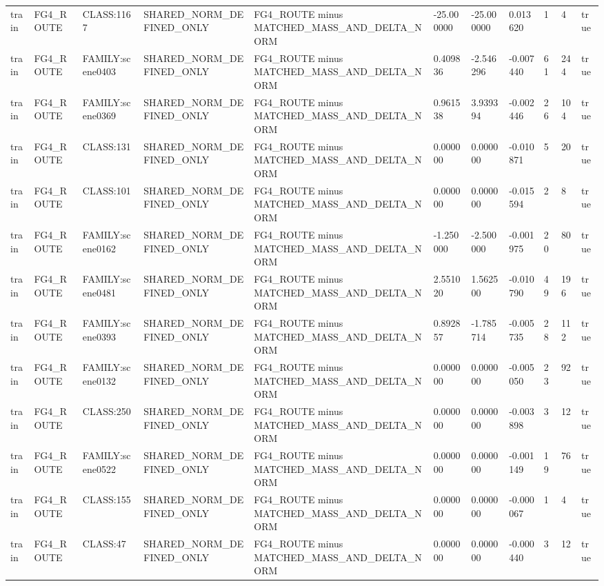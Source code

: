 \begin{tabular}{lllllllllll}
train & FG4\_ROUTE & CLASS:1167 & SHARED\_NORM\_DEFINED\_ONLY & FG4\_ROUTE minus MATCHED\_MASS\_AND\_DELTA\_NORM & -25.000000 & -25.000000 & 0.013620 & 1 & 4 & true \\
train & FG4\_ROUTE & FAMILY:scene0403 & SHARED\_NORM\_DEFINED\_ONLY & FG4\_ROUTE minus MATCHED\_MASS\_AND\_DELTA\_NORM & 0.409836 & -2.546296 & -0.007440 & 61 & 244 & true \\
train & FG4\_ROUTE & FAMILY:scene0369 & SHARED\_NORM\_DEFINED\_ONLY & FG4\_ROUTE minus MATCHED\_MASS\_AND\_DELTA\_NORM & 0.961538 & 3.939394 & -0.002446 & 26 & 104 & true \\
train & FG4\_ROUTE & CLASS:131 & SHARED\_NORM\_DEFINED\_ONLY & FG4\_ROUTE minus MATCHED\_MASS\_AND\_DELTA\_NORM & 0.000000 & 0.000000 & -0.010871 & 5 & 20 & true \\
train & FG4\_ROUTE & CLASS:101 & SHARED\_NORM\_DEFINED\_ONLY & FG4\_ROUTE minus MATCHED\_MASS\_AND\_DELTA\_NORM & 0.000000 & 0.000000 & -0.015594 & 2 & 8 & true \\
train & FG4\_ROUTE & FAMILY:scene0162 & SHARED\_NORM\_DEFINED\_ONLY & FG4\_ROUTE minus MATCHED\_MASS\_AND\_DELTA\_NORM & -1.250000 & -2.500000 & -0.001975 & 20 & 80 & true \\
train & FG4\_ROUTE & FAMILY:scene0481 & SHARED\_NORM\_DEFINED\_ONLY & FG4\_ROUTE minus MATCHED\_MASS\_AND\_DELTA\_NORM & 2.551020 & 1.562500 & -0.010790 & 49 & 196 & true \\
train & FG4\_ROUTE & FAMILY:scene0393 & SHARED\_NORM\_DEFINED\_ONLY & FG4\_ROUTE minus MATCHED\_MASS\_AND\_DELTA\_NORM & 0.892857 & -1.785714 & -0.005735 & 28 & 112 & true \\
train & FG4\_ROUTE & FAMILY:scene0132 & SHARED\_NORM\_DEFINED\_ONLY & FG4\_ROUTE minus MATCHED\_MASS\_AND\_DELTA\_NORM & 0.000000 & 0.000000 & -0.005050 & 23 & 92 & true \\
train & FG4\_ROUTE & CLASS:250 & SHARED\_NORM\_DEFINED\_ONLY & FG4\_ROUTE minus MATCHED\_MASS\_AND\_DELTA\_NORM & 0.000000 & 0.000000 & -0.003898 & 3 & 12 & true \\
train & FG4\_ROUTE & FAMILY:scene0522 & SHARED\_NORM\_DEFINED\_ONLY & FG4\_ROUTE minus MATCHED\_MASS\_AND\_DELTA\_NORM & 0.000000 & 0.000000 & -0.001149 & 19 & 76 & true \\
train & FG4\_ROUTE & CLASS:155 & SHARED\_NORM\_DEFINED\_ONLY & FG4\_ROUTE minus MATCHED\_MASS\_AND\_DELTA\_NORM & 0.000000 & 0.000000 & -0.000067 & 1 & 4 & true \\
train & FG4\_ROUTE & CLASS:47 & SHARED\_NORM\_DEFINED\_ONLY & FG4\_ROUTE minus MATCHED\_MASS\_AND\_DELTA\_NORM & 0.000000 & 0.000000 & -0.000440 & 3 & 12 & true \\

\end{tabular}
